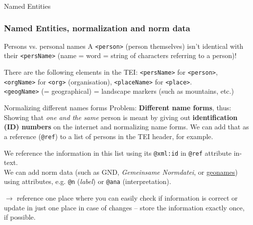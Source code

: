 

\begin{frame}{Named Entities}
\subsubsection{Named Entities, normalization and norm data}

\begin{block}{Persons vs. personal names}\small 
A \texttt{<person>} (person themselves) isn't identical with their \texttt{<persName>} (name = word = string of characters referring to a person)! 
\medskip

There are the following elements in the TEI: \texttt{<persName>} for \texttt{<person>}, \texttt{<orgName>} for \texttt{<org>} (organisation), \texttt{<placeName>} for \texttt{<place>}.\\

\texttt{<geogName>} (= geographical) = landscape markers (such as mountains, etc.) 
\end{block}

\framebreak

\begin{block}{Normalizing different names forms}\small
Problem: \textbf{Different name forms}, thus:
 Showing that \emph{one and the same} person is meant by giving out \textbf{identification (ID) numbers} on the internet and normalizing name forms. We can add that as a reference (\texttt{@ref}) to a list of persons in the TEI header, for example. 

We reference the information in this list using its \texttt{@xml:id} in \texttt{@ref} attribute in-text. \\

We can add norm data (such as GND, \emph{Gemeinsame Normdatei}, or \href{https://www.geonames.org/}{geonames}) using attributes, e.g. \texttt{@n} (\emph{label}) or \texttt{@ana} (interpretation). 
\end{block}


\framebreak

 $\to$ reference one place where you can easily check if information is correct or update in just one place in case of changes -- store the information exactly once, if possible. 


\end{frame}
